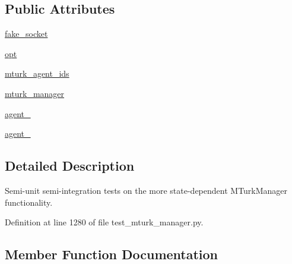 \subsection*{Public Attributes}
\begin{DoxyCompactItemize}
\item 
\hyperlink{classparlai_1_1mturk_1_1core_1_1test_1_1test__mturk__manager_1_1TestMTurkManagerConnectedFunctions_a3dfd420df777d0308e0e625311a66b2b}{fake\+\_\+socket}
\item 
\hyperlink{classparlai_1_1mturk_1_1core_1_1test_1_1test__mturk__manager_1_1TestMTurkManagerConnectedFunctions_ab80d83712b2d7749f214e9732d62a886}{opt}
\item 
\hyperlink{classparlai_1_1mturk_1_1core_1_1test_1_1test__mturk__manager_1_1TestMTurkManagerConnectedFunctions_a2f9acd81ce0c81968cad27572cf6d204}{mturk\+\_\+agent\+\_\+ids}
\item 
\hyperlink{classparlai_1_1mturk_1_1core_1_1test_1_1test__mturk__manager_1_1TestMTurkManagerConnectedFunctions_a38b88396cc47e219b066ea3ae3e7adf1}{mturk\+\_\+manager}
\item 
\hyperlink{classparlai_1_1mturk_1_1core_1_1test_1_1test__mturk__manager_1_1TestMTurkManagerConnectedFunctions_a5ea436b204f4d8f9d1033f3b6b386c8f}{agent\+\_}
\item 
\hyperlink{classparlai_1_1mturk_1_1core_1_1test_1_1test__mturk__manager_1_1TestMTurkManagerConnectedFunctions_a090084d206eee145ed6c0e7f10ce503c}{agent\+\_}
\end{DoxyCompactItemize}


\subsection{Detailed Description}
\begin{DoxyVerb}Semi-unit semi-integration tests on the more state-dependent MTurkManager
functionality.
\end{DoxyVerb}
 

Definition at line 1280 of file test\+\_\+mturk\+\_\+manager.\+py.



\subsection{Member Function Documentation}
\mbox{\label{classparlai_1_1mturk_1_1core_1_1test_1_1test__mturk__manager_1_1TestMTurkManagerConnectedFunctions_af2e2774f637d81a8bfe1df5ec9e884ad}} 
